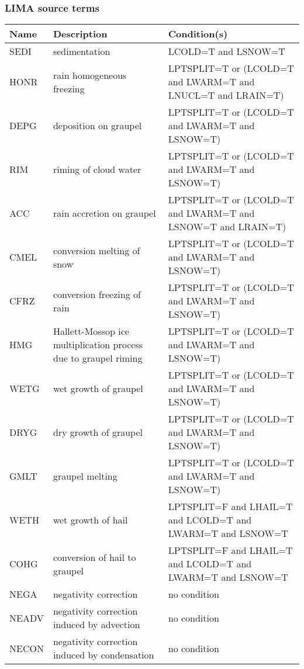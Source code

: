 \subsubsection{LIMA source terms}

\begin{longtable} {|p{}|p{}|p{}|}
\hline
Name & Description & Condition(s) \\
\hline \hline
\endhead
SEDI   & sedimentation                                 & LCOLD=T and LSNOW=T \\\hline
HONR   & rain homogeneous freezing                     & LPTSPLIT=T or (LCOLD=T and LWARM=T and LNUCL=T and LRAIN=T) \\\hline
DEPG   & deposition on graupel                         & LPTSPLIT=T or (LCOLD=T and LWARM=T and LSNOW=T) \\\hline
RIM    & riming of cloud water                         & LPTSPLIT=T or (LCOLD=T and LWARM=T and LSNOW=T) \\\hline
ACC    & rain accretion on graupel                     & LPTSPLIT=T or (LCOLD=T and LWARM=T and LSNOW=T and LRAIN=T) \\\hline
CMEL   & conversion melting of snow                    & LPTSPLIT=T or (LCOLD=T and LWARM=T and LSNOW=T) \\\hline
CFRZ   & conversion freezing of rain                   & LPTSPLIT=T or (LCOLD=T and LWARM=T and LSNOW=T) \\\hline
HMG    & Hallett-Mossop ice multiplication process due to graupel riming & LPTSPLIT=T or (LCOLD=T and LWARM=T and LSNOW=T) \\\hline
WETG   & wet growth of graupel                         & LPTSPLIT=T or (LCOLD=T and LWARM=T and LSNOW=T) \\\hline
DRYG   & dry growth of graupel                         & LPTSPLIT=T or (LCOLD=T and LWARM=T and LSNOW=T) \\\hline
GMLT   & graupel melting                               & LPTSPLIT=T or (LCOLD=T and LWARM=T and LSNOW=T) \\\hline
WETH   & wet growth of hail                            & LPTSPLIT=F and LHAIL=T and LCOLD=T and LWARM=T and LSNOW=T \\\hline
COHG   & conversion of hail to graupel                 & LPTSPLIT=F and LHAIL=T and LCOLD=T and LWARM=T and LSNOW=T \\\hline
NEGA   & negativity correction                         & no condition \\\hline
NEADV  & negativity correction induced by advection    & no condition \\\hline
NECON  & negativity correction induced by condensation & no condition \\\hline
\end{longtable}

